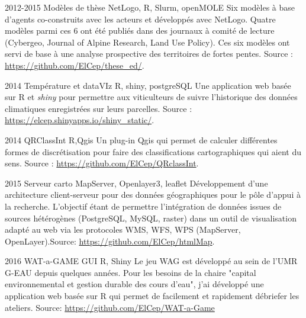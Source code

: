 \documentclass[]{cv-etienne}
\begin{document}
\begin{entrylist}
\entry
{2012-2015}
{Modèles de thèse}
{NetLogo, R, Slurm, openMOLE}
{
Six modèles à base d'agents co-construits avec les acteurs et développés avec NetLogo. Quatre modèles parmi ces 6 ont été publiés dans des journaux à comité de lecture (Cybergeo, Journal of Alpine Research, Land Use Policy). Ces six modèles ont servi de base à une analyse prospective des territoires de fortes pentes.  Source : \url{https://github.com/ElCep/these_ed/}.
}
\end{entrylist}
\begin{entrylist}
\entry
{2014}
{Température et dataVIz}
{R, shiny, postgreSQL}
{
Une application web basée sur R et \textit{shiny} pour permettre aux viticulteurs de suivre l'historique des données climatiques enregistrées sur leurs parcelles. Source : \url{https://elcep.shinyapps.io/shiny_static/}.
}
\end{entrylist}
\begin{entrylist}
\entry
{2014}
{QRClassInt}
{R,Qgis}
{
Un plug-in Qgis qui permet de calculer différentes formes de discrétisation pour faire des classifications cartographiques qui aient du sens.  Source : \url{https://github.com/ElCep/QRclassInt}.
}
\end{entrylist}
\begin{entrylist}
\entry
{2015}
{Serveur carto}
{MapServer, Openlayer3, leaflet}
{
Développement d'une architecture client-serveur pour des données géographiques pour le pôle d'appui à la recherche. L'objectif étant de permettre l'intégration de données issues de sources hétérogènes (PostgreSQL, MySQL, raster) dans un outil de visualisation adapté au web via les protocoles WMS, WFS, WPS (MapServer, OpenLayer).Source: \url{https://github.com/ElCep/htmlMap}.
}
\end{entrylist}
\begin{entrylist}
\entry
{2016}
{WAT-a-GAME GUI}
{R, Shiny}
{
Le jeu WAG est développé au sein de l'UMR G-EAU depuis quelques années. Pour les besoins de la chaire "capital environnemental et gestion durable des cours d'eau", j'ai développé une application web basée sur R qui permet de facilement et rapidement débriefer les ateliers. Source: \url{https://github.com/ElCep/WAT-a-Game}
}
\end{entrylist}
\end{document}
